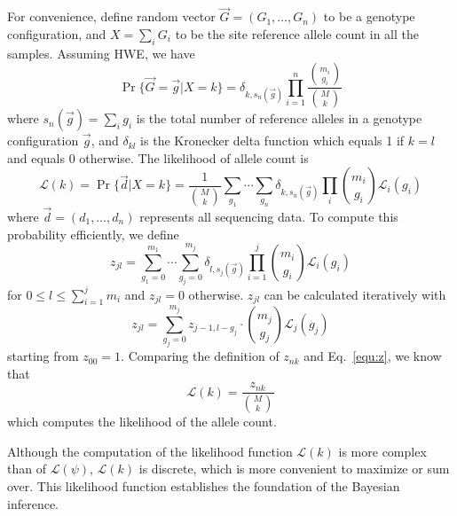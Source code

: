 \documentclass{bioinfo}
\begin{document}
\begin{methods}
For convenience, define random vector $\vec{G}=(G_1,\ldots,G_n)$ to be a
genotype configuration, and $X=\sum_iG_i$ to be the site reference allele count
in all the samples.  Assuming HWE, we have
$$
\Pr\{\vec{G}=\vec{g}|X=k\}=\delta_{k,s_n(\vec{g})}\prod_{i=1}^n\frac{\binom{m_i}{g_i}}{\binom{M}{k}}
$$
where $s_n(\vec{g})=\sum_i g_i$ is the total number of reference alleles in a
genotype configuration $\vec{g}$, and $\delta_{kl}$ is the Kronecker delta
function which equals 1 if $k=l$ and equals 0 otherwise. The likelihood of
allele count is
\begin{equation}\label{equ:klk}
\mathcal{L}(k)=\Pr\{\vec{d}|X=k\}=\frac{1}{\binom{M}{k}}\sum_{g_1}\cdots\sum_{g_n}\delta_{k,s_n(\vec{g})}\prod_i\binom{m_i}{g_i}\mathcal{L}_i(g_i)
\end{equation}
where $\vec{d}=(d_1,\ldots,d_n)$ represents all sequencing data. To compute
this probability efficiently, we define
\begin{equation}\label{eq:z-def}
z_{jl}=\sum_{g_1=0}^{m_1}\cdots\sum_{g_j=0}^{m_j}\delta_{l,s_j(\vec{g})}\prod_{i=1}^j\binom{m_i}{g_i}\mathcal{L}_i(g_i)
\end{equation}
for $0\le l\le \sum_{i=1}^jm_i$ and $z_{jl}=0$ otherwise. $z_{jl}$ can be
calculated iteratively with
\begin{equation}\label{equ:z}
z_{jl}=\sum_{g_j=0}^{m_j}z_{j-1,l-g_j}\cdot\binom{m_j}{g_j}\mathcal{L}_j(g_j)
\end{equation}
starting from $z_{00}=1$. Comparing the definition of $z_{nk}$ and
Eq.~\eqref{equ:z}, we know that
\begin{equation}\label{equ:klk2}
\mathcal{L}(k)=\frac{z_{nk}}{\binom{M}{k}}
\end{equation}
which computes the likelihood of the allele count.

Although the computation of the likelihood function $\mathcal{L}(k)$ is more
complex than of $\mathcal{L}(\psi)$, $\mathcal{L}(k)$ is discrete, which is
more convenient to maximize or sum over. This likelihood function establishes
the foundation of the Bayesian inference.


\end{methods}
\end{document}
